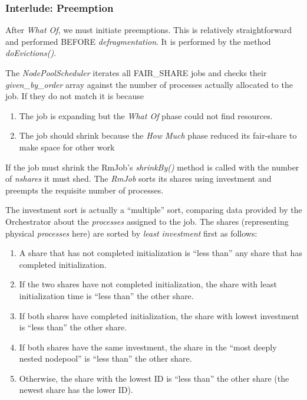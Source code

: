 \subsubsection{Interlude: Preemption}
   After {\em What Of}, we must initiate preemptions.  This is relatively straightforward and performed
   BEFORE {\em defragmentation}.  It is performed by the method {\em doEvictions()}.

   The {\em NodePoolScheduler} iterates all FAIR\_SHARE jobs and checks their {\em given\_by\_order}
   array against the number of processes actually allocated to the job.  If they do not match it is
   because
   \begin{enumerate}
     \item The job is expanding but the {\em What Of} phase could not find resources.
     \item The job should shrink because the {\em How Much} phase reduced its fair-share
       to make space for other work
   \end{enumerate}
   
   If the job must shrink the RmJob's {\em shrinkBy()} method is called with the number of {\em nshares} it
   must shed.  The {\em RmJob} sorts its shares using investment and preempts the requisite number
   of processes. 

   The investment sort is actually a ``multiple'' sort, comparing data provided by the Orchestrator about
   the {\em processes} assigned to the job.  The 
   shares (representing physical {\em processes} here)
   are sorted by {\em least investment} first as follows:
   \begin{enumerate}
     \item A share that has not completed initialization is ``less than'' any share that has completed 
       initialization.
     \item If the two shares have not completed initialization, the share with least initialization time is ``less than''
       the other share.
     \item If both shares have completed initialization, the share with lowest investment is ``less than'' the other share.
     \item If both shares have the same investment, the share in the ``most deeply nested nodepool'' is ``less than'' the other
       share.
     \item Otherwise, the share with the lowest ID is ``less than'' the other share (the newest share has the lower ID).
   \end{enumerate}

